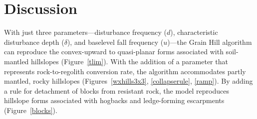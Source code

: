 \documentclass[esurf, manuscript]{copernicus}
\begin{document}




\section{Discussion}

With just three parameters---disturbance frequency ($d$), characteristic disturbance depth ($\delta$), and baselevel fall frequency ($u$)---the Grain Hill algorithm can reproduce the convex-upward to quasi-planar forms associated with soil-mantled hillslopes (Figure~\ref{tlim}). With the addition of a parameter that represents rock-to-regolith conversion rate, the algorithm accommodates partly mantled, rocky hillslopes (Figures~\ref{wxhills3x3}, \ref{collapserule}, \ref{ramp}). By adding a rule for detachment of blocks from resistant rock, the model reproduces hillslope forms associated with hogbacks and ledge-forming escarpments (Figure~\ref{blocks}).
\end{document}
